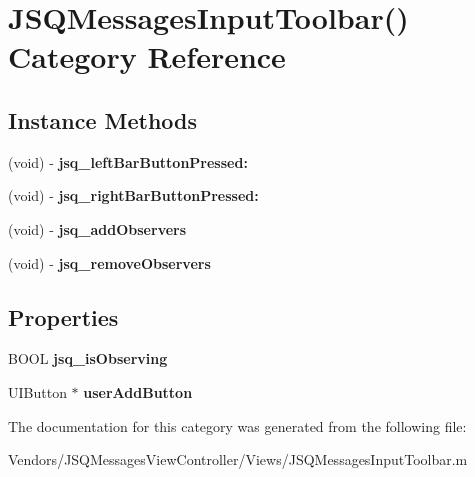 \hypertarget{category_j_s_q_messages_input_toolbar_07_08}{}\section{J\+S\+Q\+Messages\+Input\+Toolbar() Category Reference}
\label{category_j_s_q_messages_input_toolbar_07_08}
\subsection*{Instance Methods}
\begin{DoxyCompactItemize}
\item 
\hypertarget{category_j_s_q_messages_input_toolbar_07_08_abe2ec773dc753e0b94f821e7bfd2de3a}{}(void) -\/ {\bfseries jsq\+\_\+left\+Bar\+Button\+Pressed\+:}\label{category_j_s_q_messages_input_toolbar_07_08_abe2ec773dc753e0b94f821e7bfd2de3a}

\item 
\hypertarget{category_j_s_q_messages_input_toolbar_07_08_a4a07b5d28c7bb4cc6a2618ed9ef9d439}{}(void) -\/ {\bfseries jsq\+\_\+right\+Bar\+Button\+Pressed\+:}\label{category_j_s_q_messages_input_toolbar_07_08_a4a07b5d28c7bb4cc6a2618ed9ef9d439}

\item 
\hypertarget{category_j_s_q_messages_input_toolbar_07_08_a7c65f97b363f105dee1628c9346f8b84}{}(void) -\/ {\bfseries jsq\+\_\+add\+Observers}\label{category_j_s_q_messages_input_toolbar_07_08_a7c65f97b363f105dee1628c9346f8b84}

\item 
\hypertarget{category_j_s_q_messages_input_toolbar_07_08_abc7df98c911ab994d8c0a97610891f01}{}(void) -\/ {\bfseries jsq\+\_\+remove\+Observers}\label{category_j_s_q_messages_input_toolbar_07_08_abc7df98c911ab994d8c0a97610891f01}

\end{DoxyCompactItemize}
\subsection*{Properties}
\begin{DoxyCompactItemize}
\item 
\hypertarget{category_j_s_q_messages_input_toolbar_07_08_a76cc88e04f4dbee68b59ee83f4037fd4}{}B\+O\+O\+L {\bfseries jsq\+\_\+is\+Observing}\label{category_j_s_q_messages_input_toolbar_07_08_a76cc88e04f4dbee68b59ee83f4037fd4}

\item 
\hypertarget{category_j_s_q_messages_input_toolbar_07_08_ab1478608695227209e154ee9d1afd272}{}U\+I\+Button $\ast$ {\bfseries user\+Add\+Button}\label{category_j_s_q_messages_input_toolbar_07_08_ab1478608695227209e154ee9d1afd272}

\end{DoxyCompactItemize}


The documentation for this category was generated from the following file\+:\begin{DoxyCompactItemize}
\item 
Vendors/\+J\+S\+Q\+Messages\+View\+Controller/\+Views/J\+S\+Q\+Messages\+Input\+Toolbar.\+m\end{DoxyCompactItemize}
